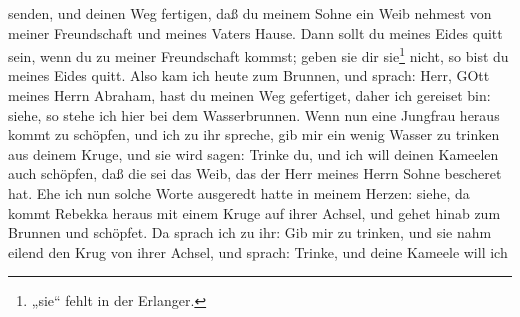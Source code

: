 senden, und deinen Weg fertigen, daß du meinem Sohne ein Weib nehmest von meiner Freundschaft und meines Vaters Hause. Dann sollt du meines Eides quitt sein, wenn du zu meiner Freundschaft kommst; geben sie dir sie\footnote{„sie“ fehlt in der Erlanger.} nicht, so bist du meines Eides quitt. Also kam ich heute zum Brunnen, und sprach: Herr, GOtt meines Herrn Abraham, hast du meinen Weg gefertiget, daher ich gereiset bin: siehe, so stehe ich hier bei dem Wasserbrunnen. Wenn nun eine Jungfrau heraus kommt zu schöpfen, und ich zu ihr spreche, gib mir ein wenig Wasser zu trinken aus deinem Kruge, und sie wird sagen: Trinke du, und ich will deinen Kameelen auch schöpfen, daß die sei das Weib, das der Herr meines Herrn Sohne bescheret hat. Ehe ich nun solche Worte ausgeredt hatte in meinem Herzen: siehe, da kommt Rebekka heraus mit einem Kruge auf ihrer Achsel, und gehet hinab zum Brunnen und schöpfet. Da sprach ich zu ihr: Gib mir zu trinken, und sie nahm eilend den Krug von ihrer Achsel, und sprach: Trinke, und deine Kameele will ich
